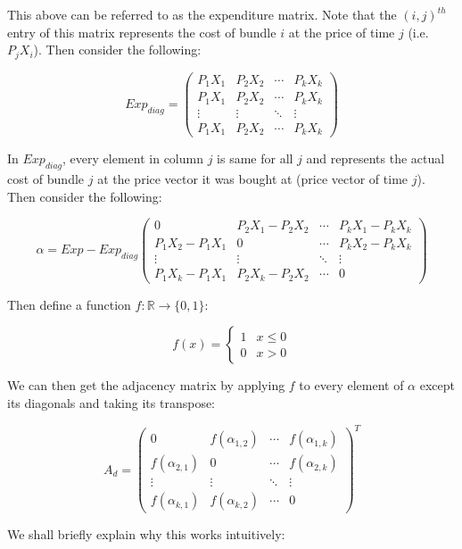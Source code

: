 \documentclass{article} %
\begin{document}
This above can be referred to as the expenditure matrix. Note that the $(i,j)^{th}$ entry of this matrix represents the cost of bundle $i$ at the price of time $j$ (i.e. $P_jX_i$). Then consider the following:

\[
Exp_{diag} = 
 \begin{pmatrix}
  P_1X_1 & P_2X_2 & \cdots & P_kX_k \\
  P_1X_1 & P_2X_2 & \cdots & P_kX_k \\
  \vdots  & \vdots  & \ddots & \vdots  \\
  P_1X_1 & P_2X_2 & \cdots & P_kX_k
 \end{pmatrix}
\]

In $Exp_{diag}$, every element in column $j$ is same for all $j$ and represents the actual cost of bundle $j$ at the price vector it was bought at (price vector of time $j$). Then consider the following:

\[
\alpha = Exp-Exp_{diag}
 \begin{pmatrix}
  0 & P_2X_1-P_2X_2 & \cdots & P_kX_1-P_kX_k \\
  P_1X_2-P_1X_1 & 0 & \cdots & P_kX_2-P_kX_k \\
  \vdots  & \vdots  & \ddots & \vdots  \\
  P_1X_k-P_1X_1 & P_2X_k-P_2X_2 & \cdots & 0
 \end{pmatrix}
\]

Then define a function $f:\mathbb{R}\to\{0,1\}$:

\[ 
f(x)=
    \begin{cases} 
      1 & x\leq0 \\
      0 & x>0
   \end{cases}
\]

We can then get the adjacency matrix by applying $f$ to every element of $\alpha$ except its diagonals and taking its transpose:

\[
A_d =
 \begin{pmatrix}
  0 & f(\alpha_{1,2}) & \cdots & f(\alpha_{1,k}) \\
  f(\alpha_{2,1}) & 0 & \cdots & f(\alpha_{2,k}) \\
  \vdots  & \vdots  & \ddots & \vdots  \\
  f(\alpha_{k,1}) & f(\alpha_{k,2}) & \cdots & 0
 \end{pmatrix} ^T
\]

We shall briefly explain why this works intuitively:
\end{document}
